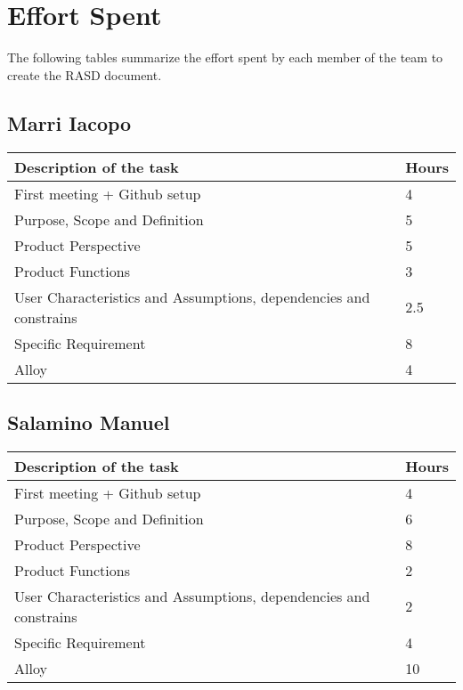 \section{Effort Spent}
The following tables summarize the effort spent by each member of the team to create the RASD document.
\subsection{Marri Iacopo}
\begin{center}
\renewcommand{\arraystretch}{1.5}
\begin{tabular}{ |m{7cm}|m{2cm}| } 
 \hline
 \textbf{Description of the task}  & \textbf{Hours} \\
 \hline
 First meeting + Github setup & 4 \\
 \hline
 Purpose, Scope and Definition & 5 \\
 \hline
 Product Perspective & 5 \\ 
 \hline
 Product Functions & 3 \\ 
 \hline 
 User Characteristics and Assumptions, dependencies and constrains & 2.5 \\ 
 \hline
 Specific Requirement & 8 \\
 \hline
 Alloy &  4 \\
 \hline
\end{tabular}
\end{center}


\subsection{Salamino Manuel}
\renewcommand{\arraystretch}{1.5}

\begin{center}
\begin{tabular}{ |m{7cm}|m{2cm}| } 
 \hline
 \textbf{Description of the task}  & \textbf{Hours} \\
 \hline
 First meeting + Github setup & 4\\
 \hline
 Purpose, Scope and Definition & 6 \\
 \hline
 Product Perspective & 8 \\ 
 \hline
 Product Functions & 2 \\ 
 \hline 
 User Characteristics and Assumptions, dependencies and constrains & 2 \\ 
 \hline
 Specific Requirement & 4 \\
 \hline
 Alloy & 10\\
 \hline
\end{tabular}
\end{center}

